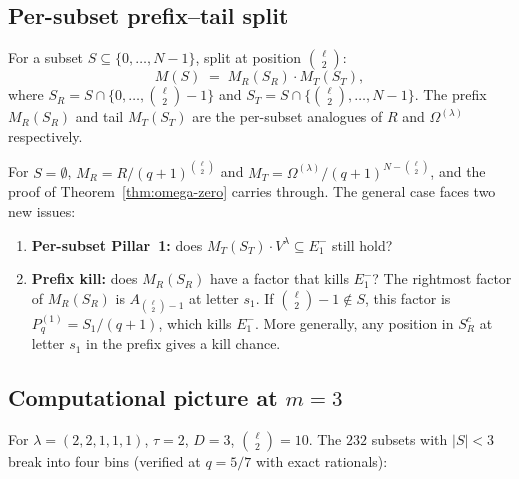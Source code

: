 \documentclass[11pt]{article}
\theoremstyle{definition}
\newcommand{\Om}{\Omega}
\newcommand{\Omtail}{\Om^{(\lambda)}}
\newcommand{\Eminus}[1]{E^-_{#1}}
\begin{document}
\subsection{Per-subset prefix--tail split}

For a subset $S \subseteq \{0, \ldots, N-1\}$, split at position
$\binom{\ell}{2}$:
\[
   M(S) \;=\; M_R(S_R) \cdot M_T(S_T),
\]
where $S_R = S \cap \{0,\ldots,\binom{\ell}{2}-1\}$ and
$S_T = S \cap \{\binom{\ell}{2},\ldots,N-1\}$. The prefix
$M_R(S_R)$ and tail $M_T(S_T)$ are the per-subset analogues of $R$ and
$\Omtail$ respectively.

For $S = \emptyset$, $M_R = R/(q+1)^{\binom{\ell}{2}}$ and
$M_T = \Omtail/(q+1)^{N-\binom{\ell}{2}}$, and the proof of
Theorem~\ref{thm:omega-zero} carries through. The general case faces two
new issues:
\begin{enumerate}[label=(\roman*),topsep=0.2em,itemsep=0.1em]
\item \textbf{Per-subset Pillar~1:} does
   $M_T(S_T)\cdot V^\lambda \subseteq \Eminus 1$ still hold?
\item \textbf{Prefix kill:} does $M_R(S_R)$ have a factor that kills
   $\Eminus 1$? The rightmost factor of $M_R(S_R)$ is $A_{\binom{\ell}{2}-1}$
   at letter $s_1$. If $\binom{\ell}{2}-1 \notin S$, this factor is
   $P_q^{(1)} = S_1/(q+1)$, which kills $\Eminus 1$. More generally,
   any position in $S_R^c$ at letter $s_1$ in the prefix gives a kill chance.
\end{enumerate}

\subsection{Computational picture at $m=3$}

For $\lambda = (2,2,1,1,1)$, $\tau = 2$, $D = 3$, $\binom{\ell}{2} = 10$.
The $232$ subsets with $|S| < 3$ break into four bins (verified at $q = 5/7$
with exact rationals):
\end{document}
